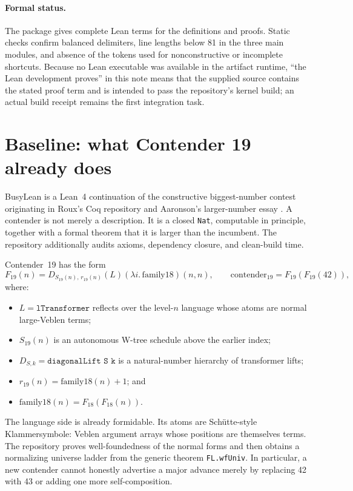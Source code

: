 \documentclass[11pt]{article}
\theoremstyle{definition}
\theoremstyle{remark}
\newcommand{\code}[1]{\texttt{#1}}
\begin{document}
\paragraph{Formal status.}
The package gives complete Lean terms for the definitions and proofs.  Static
checks confirm balanced delimiters, line lengths below 81 in the three main
modules, and absence of the tokens used for nonconstructive or incomplete
shortcuts.  Because no Lean executable was available in the artifact runtime,
``the Lean development proves'' in this note means that the supplied source
contains the stated proof term and is intended to pass the repository's kernel
build; an actual build receipt remains the first integration task.

\section{Baseline: what Contender 19 already does}

BusyLean is a Lean~4 continuation of the constructive biggest-number contest
originating in Roux's Coq repository and Aaronson's larger-number essay
\cite{aaronson,roux}.  A contender is not merely a description.  It is a closed
\code{Nat}, computable in principle, together with a formal theorem that it is
larger than the incumbent.  The repository additionally audits axioms,
dependency closure, and clean-build time.

Contender~19 has the form
\[
F_{19}(n)=D_{S_{19}(n),\,r_{19}(n)}(L)
  (\lambda i.\,\mathrm{family18})(n,n),
\qquad
\mathrm{contender}_{19}=F_{19}(F_{19}(42)),
\]
where:
\begin{itemize}[leftmargin=*]
\item \(L=\code{lTransformer}\) reflects over the level-\(n\) language whose
  atoms are normal large-Veblen terms;
\item \(S_{19}(n)\) is an autonomous W-tree schedule above the earlier index;
\item \(D_{S,k}=\code{diagonalLift S k}\) is a natural-number hierarchy of
  transformer lifts;
\item \(r_{19}(n)=\mathrm{family18}(n)+1\); and
\item \(\mathrm{family18}(n)=F_{18}(F_{18}(n))\).
\end{itemize}

The language side is already formidable.  Its atoms are Sch\"utte-style
Klammersymbole: Veblen argument arrays whose positions are themselves terms.
The repository proves well-foundedness of the normal forms and then obtains a
normalizing universe ladder from the generic theorem \code{FL.wfUniv}.  In
particular, a new contender cannot honestly advertise a major advance merely
by replacing 42 with 43 or adding one more self-composition.
\end{document}
